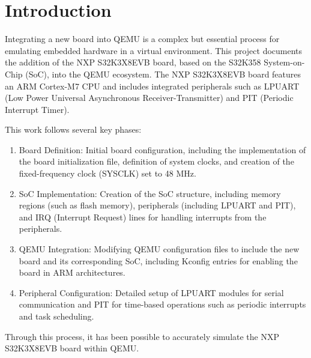 \chapter{Introduction}
Integrating a new board into QEMU is a complex but essential process for emulating embedded hardware in a virtual environment. This project documents the addition of the NXP S32K3X8EVB board, based on the S32K358 System-on-Chip (SoC), into the QEMU ecosystem. The NXP S32K3X8EVB board features an ARM Cortex-M7 CPU and includes integrated peripherals such as LPUART (Low Power Universal Asynchronous Receiver-Transmitter) and PIT (Periodic Interrupt Timer).

This work follows several key phases:
\begin{enumerate}
\item Board Definition: Initial board configuration, including the implementation of the board initialization file, definition of system clocks, and creation of the fixed-frequency clock (SYSCLK) set to 48 MHz.
\item SoC Implementation: Creation of the SoC structure, including memory regions (such as flash memory), peripherals (including LPUART and PIT), and IRQ (Interrupt Request) lines for handling interrupts from the peripherals.
\item QEMU Integration: Modifying QEMU configuration files to include the new board and its corresponding SoC, including Kconfig entries for enabling the board in ARM architectures.
\item Peripheral Configuration: Detailed setup of LPUART modules for serial communication and PIT for time-based operations such as periodic interrupts and task scheduling.
\end{enumerate}

Through this process, it has been possible to accurately simulate the NXP S32K3X8EVB board within QEMU.
 

